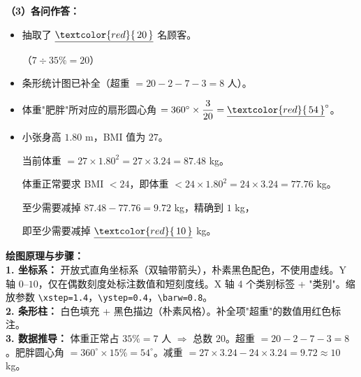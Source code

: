 \vspace{0.4cm}
\textbf{（3）各问作答：}

\begin{itemize}
    \item[\textbf{(1)}] 抽取了 $\underline{\textcolor{red}{\,20\,}}$ 名顾客。

    （$7 \div 35\% = 20$）

    \item[\textbf{(2)}] 条形统计图已补全（超重 $= 20 - 2 - 7 - 3 = 8$ 人）。

    \item[\textbf{(3)}] 体重"肥胖"所对应的扇形圆心角 $= 360^\circ \times \dfrac{3}{20} = \underline{\textcolor{red}{\,54\,}}^\circ$。

    \item[\textbf{(4)}] 小张身高 $1.80$ m，BMI 值为 $27$。

    当前体重 $= 27 \times 1.80^2 = 27 \times 3.24 = 87.48$ kg。

    体重正常要求 BMI $< 24$，即体重 $< 24 \times 1.80^2 = 24 \times 3.24 = 77.76$ kg。

    至少需要减掉 $87.48 - 77.76 = 9.72$ kg，精确到 $1$ kg，

    即至少需要减掉 $\underline{\textcolor{red}{\,10\,}}$ kg。
\end{itemize}

\vspace{0.4cm}
{\small\color{blue!70!black}
\textbf{绘图原理与步骤：}\\
\textbf{1. 坐标系：} 开放式直角坐标系（双轴带箭头），朴素黑色配色，不使用虚线。Y 轴 $0$--$10$，仅在偶数刻度处标注数值和短刻度线。X 轴 4 个类别标签 + "类别"。缩放参数 \texttt{\textbackslash{}xstep=1.4}，\texttt{\textbackslash{}ystep=0.4}，\texttt{\textbackslash{}barw=0.8}。\\
\textbf{2. 条形柱：} 白色填充 + 黑色描边（朴素风格）。补全项"超重"的数值用红色标注。\\
\textbf{3. 数据推导：} 体重正常占 $35\% = 7$ 人 $\Rightarrow$ 总数 $20$。超重 $= 20 - 2 - 7 - 3 = 8$。肥胖圆心角 $= 360^\circ \times 15\% = 54^\circ$。减重 $= 27 \times 3.24 - 24 \times 3.24 = 9.72 \approx 10$ kg。
}

\newpage



\newpage

